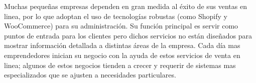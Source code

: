 \setcounter{page}{1}  %
\thispagestyle{empty}  %

Muchas pequeñas empresas dependen en gran medida al éxito de sus ventas en linea, por lo que adoptan el uso de tecnologías robustas (como Shopify y WooCommerce) para su administración. Su función principal es servir como puntos de entrada para los clientes pero dichos servicios no están diseñados para mostrar información detallada a distintas áreas de la empresa. Cada día mas emprendedores inician su negocio con la ayuda de estos servicios de venta en linea; algunos de estos negocios tienden a crecer y requerir de sistemas mas especializados que se ajusten a necesidades particulares.